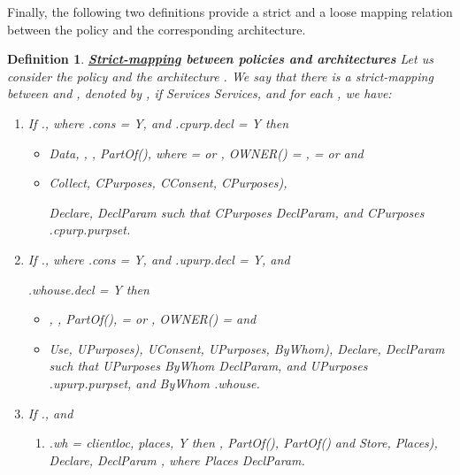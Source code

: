 \documentclass[a4paper]{article}
\newtheorem{ttd}{Definition}
\begin{document}
Finally, the following two definitions provide a strict and a loose mapping relation between the policy and the corresponding architecture.

\begin{ttd} \textbf{\underline{Strict-mapping} between policies and architectures}
\label{map}    
\noindent Let us consider the policy  and the architecture . We say that there is a strict-mapping between  and , denoted by   , if \textit{Services}  \textit{Services}, and for each   , we have:

\begin{enumerate} 

\item If  ., where .\textit{cons} = Y, and .\textit{cpurp}.\textit{decl} = Y then
\begin{itemize} 
\item    \textit{Data},  ,  ,   \textit{PartOf}(), where   =  or   , OWNER() = ,  =  or    and 

\item \textit{Collect}, \textit{CPurposes}, \textit{CConsent}, \textit{CPurposes}), 

\textit{Declare}, \textit{DeclParam}   such that \textit{CPurposes}  \textit{DeclParam}, and \textit{CPurposes}   .\textit{cpurp}.\textit{purpset}.   
\end{itemize}

\item If  ., where .\textit{cons} = Y, 
 and .\textit{upurp}.\textit{decl} = Y,  and 
 
 .\textit{whouse}.\textit{decl} = Y then 
 
\begin{itemize} 
\item , ,   \textit{PartOf}(),  =  or   , OWNER() =  and 

\item \textit{Use}, \textit{UPurposes}), \textit{UConsent}, \textit{UPurposes}, \textit{ByWhom}), \textit{Declare}, \textit{DeclParam}   such that  \textit{UPurposes}  \textit{ByWhom}  \textit{DeclParam}, and \textit{UPurposes}   .\textit{upurp}.\textit{purpset}, and \textit{ByWhom}   .\textit{whouse}. 

\end{itemize} 

\item If  ., and 

\begin{enumerate} 
\item .\textit{wh} = \textit{clientloc}, \textit{places}, Y then  ,    \textit{PartOf}(),   \textit{PartOf}() and  \textit{Store}, \textit{Places}), \textit{Declare}, \textit{DeclParam}  , where \textit{Places}  \textit{DeclParam}. 


\end{enumerate}
\end{enumerate}
\end{ttd}
\end{document}
